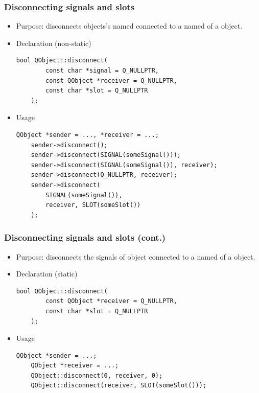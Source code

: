 \begin{frame}[fragile]
  \frametitle{Disconnecting signals and slots}
   \small
   \begin{itemize}
      \item Purpose: disconnects \verb@this@ objects's named \verb@signal@
        connected to a named \verb@slot@ of a \verb@receiver@ object.
      \item Declaration (non-static)
      \begin{lstlisting}[basicstyle=\scriptsize\ttfamily]
	bool QObject::disconnect(
	    const char *signal = Q_NULLPTR,
	    const QObject *receiver = Q_NULLPTR,
	    const char *slot = Q_NULLPTR
	);
      \end{lstlisting}
      \item Usage
      \begin{lstlisting}[basicstyle=\scriptsize\ttfamily]
	QObject *sender = ..., *receiver = ...;
	sender->disconnect();
	sender->disconnect(SIGNAL(someSignal()));
	sender->disconnect(SIGNAL(someSignal()), receiver);
	sender->disconnect(Q_NULLPTR, receiver);
	sender->disconnect(
	    SIGNAL(someSignal()),
	    receiver, SLOT(someSlot())
	);
      \end{lstlisting}
    \end{itemize}
\end{frame}

\begin{frame}[fragile]
  \frametitle{Disconnecting signals and slots (cont.)}
   \small
   \begin{itemize}
      \item Purpose: disconnects the signals of \verb@this@ object
        connected to a named \verb@slot@ of a \verb@receiver@ object.
      \item Declaration (static)
      \begin{lstlisting}[basicstyle=\scriptsize\ttfamily]
	bool QObject::disconnect(
	    const QObject *receiver = Q_NULLPTR,
	    const char *slot = Q_NULLPTR
	);
      \end{lstlisting}
      \item Usage
      \begin{lstlisting}[basicstyle=\scriptsize\ttfamily]
	QObject *sender = ...;
	QObject *receiver = ...;
	QObject::disconnect(0, receiver, 0);
	QObject::disconnect(receiver, SLOT(someSlot()));
      \end{lstlisting}
    \end{itemize}
\end{frame}


